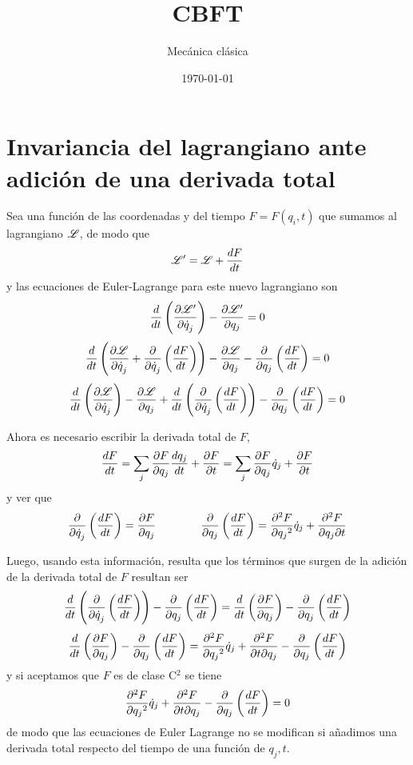 \documentclass[10pt,oneside]{CBFT_article}
\title{CBFT}
\author{Mecánica clásica}
\date{\today}
\begin{document}
\maketitle
\tableofcontents



\section{Invariancia del lagrangiano ante adición de una derivada total}

Sea una función de las coordenadas y del tiempo $F=F(q_i,t)$ que sumamos al lagrangiano $\Lag$, de modo que
\[\Lag'=\Lag + \dtot{F}{t} \]
y las ecuaciones de Euler-Lagrange para este nuevo lagrangiano son
\[ \frac{d}{dt}\left(\dpar{\Lag'}{\dot{q}_j}\right) - \dpar{\Lag'}{q_j} = 0 \]
\[ \dtot{}{t}\left(\dpar{\Lag}{\dot{q}_j} + \dpar{}{\dot{q}_j}\left(\dtot{F}{t}\right)\right) - \dpar{\Lag}{q_j} - 
\dpar{}{q_j}\left( \dtot{F}{t}\right) = 0 \]
\[ \dtot{}{t}\left(\dpar{\Lag}{\dot{q}_j}\right) - \dpar{\Lag}{q_j} + 
\dtot{}{t}\left(\dpar{}{\dot{q}_j}\left(\dtot{F}{t}\right)\right) - \dpar{}{q_j}\left( \dtot{F}{t}\right) = 0 \]

Ahora es necesario escribir la derivada total de $F$,
\[  \dtot{F}{t} = \sum_j \dpar{F}{q_j}\dtot{q_j}{t} + \dpar{F}{t} = \sum_j \dpar{F}{q_j}\dot{q}_j + \dpar{F}{t} \]
y ver que
\[  \dpar{}{\dot{q}_j}\left(\dtot{F}{t}\right) = \dpar{F}{q_j} \qquad\qquad
\dpar{}{q_j}\left(\dtot{F}{t}\right) = \dpar[2]{F}{q_j} \dot{q}_j + \dparcru{F}{t}{q_j} \]

Luego, usando esta información, resulta que los términos que surgen de la adición de la derivada total de $F$ resultan 
ser
\[  \dtot{}{t}\left( \dpar{}{\dot{q}_j}\left(\dtot{F}{t}\right)\right) - \dpar{}{q_j}\left( \dtot{F}{t}\right) = 
\dtot{}{t}\left( \dpar{F}{q_j} \right) - \dpar{}{q_j}\left( \dtot{F}{t}\right)\]
\[ \dtot{}{t}\left( \dpar{F}{q_j} \right) - \dpar{}{q_j}\left( \dtot{F}{t}\right) =
\dpar[2]{F}{q_j} \dot{q}_j + \dparcru{F}{q_j}{t} - \dpar{}{q_j}\left( \dtot{F}{t}\right) \]
y si aceptamos que $F$ es de clase C$^2$ se tiene
\[\dpar[2]{F}{q_j} \dot{q}_j + \dparcru{F}{q_j}{t} - \dpar{}{q_j}\left( \dtot{F}{t}\right)=0\]
de modo que las ecuaciones de Euler Lagrange no se modifican si añadimos una derivada total respecto del tiempo de una 
función de $q_j,t$.




\end{document}
